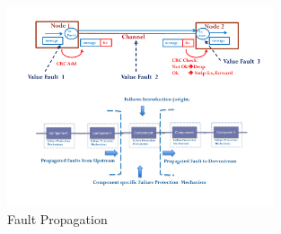\begin{figure}
\begin{center}
\includegraphics[width=0.7\textwidth]{figures/fault_propagation.pdf}
\caption{Fault Propagation}
\label{fig:fault_propagation}
\end{center}
\end{figure}
